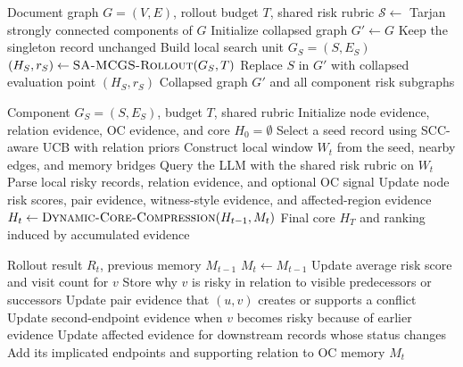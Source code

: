 \documentclass[11pt]{article}
\newcommand{\samcgs}{SA-MCGS}
\newcommand{\scc}{SCC}
\newcommand{\oc}{OC}
\begin{document}
\begin{algorithm}[H]
\small
\caption{\scc{}-localized search}
\label{alg:appendix_scc_localized}
\begin{algorithmic}[1]
\REQUIRE Document graph $G=(V,E)$, rollout budget $T$, shared risk rubric
\STATE $\mathcal{S}\leftarrow$ Tarjan strongly connected components of $G$
\STATE Initialize collapsed graph $G' \leftarrow G$
        \STATE Keep the singleton record unchanged
    \ELSE
        \STATE Build local search unit $G_S=(S,E_S)$
        \STATE $(H_S,r_S)\leftarrow \textsc{SA-MCGS-Rollout}(G_S,T)$
        \STATE Replace $S$ in $G'$ with collapsed evaluation point $(H_S,r_S)$
    \ENDIF
\ENDFOR
\RETURN Collapsed graph $G'$ and all component risk subgraphs
\end{algorithmic}
\end{algorithm}

\begin{algorithm}[H]
\small
\caption{\samcgs{} rollout inside one component}
\label{alg:appendix_rollout}
\begin{algorithmic}[1]
\REQUIRE Component $G_S=(S,E_S)$, budget $T$, shared rubric
\STATE Initialize node evidence, relation evidence, \oc{} evidence, and core $H_0=\emptyset$
    \STATE Select a seed record using SCC-aware UCB with relation priors
    \STATE Construct local window $W_t$ from the seed, nearby edges, and memory bridges
    \STATE Query the LLM with the shared risk rubric on $W_t$
    \STATE Parse local risky records, relation evidence, and optional \oc{} signal
    \STATE Update node risk scores, pair evidence, witness-style evidence, and affected-region evidence
    \STATE $H_t\leftarrow \textsc{Dynamic-Core-Compression}(H_{t-1},M_t)$
\ENDFOR
\RETURN Final core $H_T$ and ranking induced by accumulated evidence
\end{algorithmic}
\end{algorithm}

\begin{algorithm}[H]
\small
\caption{Relation-first evidence memory}
\label{alg:appendix_relation_memory}
\begin{algorithmic}[1]
\REQUIRE Rollout result $R_t$, previous memory $M_{t-1}$
\STATE $M_t\leftarrow M_{t-1}$
    \STATE Update average risk score and visit count for $v$
    \STATE Store why $v$ is risky in relation to visible predecessors or successors
\ENDFOR
{}
    \STATE Update pair evidence that $(u,v)$ creates or supports a conflict
    \STATE Update second-endpoint evidence when $v$ becomes risky because of earlier evidence
    \STATE Update affected evidence for downstream records whose status changes
\ENDFOR
\IF{$R_t$ contains an \oc{} signal}
    \STATE Add its implicated endpoints and supporting relation to \oc{} memory
\ENDIF
\RETURN $M_t$
\end{algorithmic}
\end{algorithm}
\end{document}
